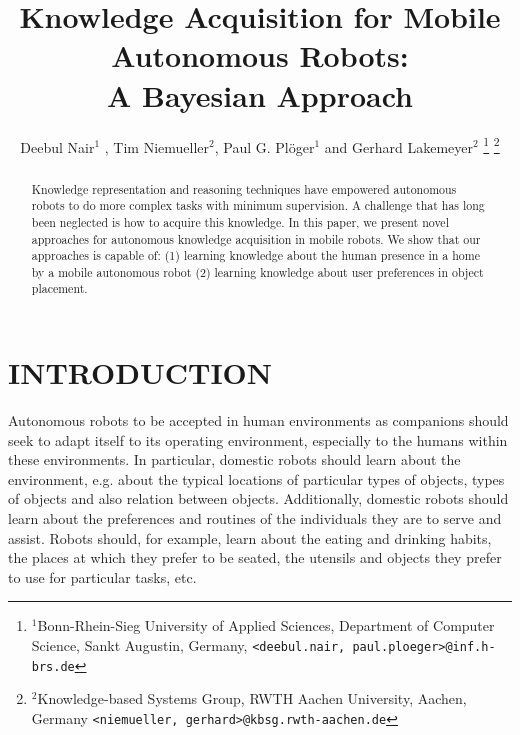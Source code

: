 \documentclass[a4paper, 10pt, conference]{ieeeconf}      %
\title{\LARGE \bf
Knowledge Acquisition for Mobile Autonomous Robots:\\
A Bayesian Approach  }
\author{Deebul Nair$^{1}$ ,  Tim Niemueller$^{2}$, Paul G. Pl\"{o}ger$^{1}$ and Gerhard Lakemeyer$^{2}$%
\thanks{$^{1}$Bonn-Rhein-Sieg University of Applied Sciences, Department of Computer Science,
Sankt Augustin, Germany,
        {\tt\small {<deebul.nair, paul.ploeger>}@inf.h-brs.de}}%
\thanks{$^{2}$Knowledge-based Systems Group,
RWTH Aachen University, Aachen, Germany 
        {\tt\small {<niemueller, gerhard>}@kbsg.rwth-aachen.de}}%
}
\begin{document}
\maketitle
\thispagestyle{empty}
\pagestyle{empty}


\begin{abstract}

Knowledge representation and reasoning techniques have empowered autonomous robots to do more complex tasks with minimum supervision. A  challenge  that  has  long been neglected is how to acquire this knowledge. In this paper, we present novel approaches for autonomous knowledge acquisition in mobile robots. We show that our approaches is capable of:
(1) learning knowledge about the human presence in a home by a mobile autonomous robot (2) learning knowledge about user preferences in object placement. 

\end{abstract}


\section{INTRODUCTION}
Autonomous robots to be accepted in human environments as companions should seek to adapt itself to its operating environment, especially to the humans within these environments.  In particular, domestic robots should learn about the environment, e.g. about the typical locations of particular types of objects, types of objects and also relation between objects. Additionally, domestic robots should learn about the preferences and routines of the individuals they are to serve and assist.
Robots should, for example, learn about the eating and drinking habits, the places at which they prefer to be seated, the  utensils  and  objects  they  prefer  to  use  for  particular  tasks, etc.  
\end{document}
